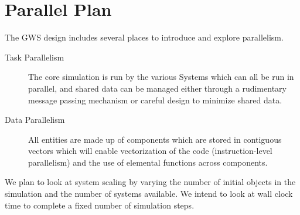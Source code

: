 \chapter*{Parallel Plan}

The GWS design includes several places to introduce and explore parallelism.

\begin{description}
\item[Task Parallelism] The core simulation is run by the various Systems which can all be run in parallel, and shared data can be managed either through a rudimentary message passing mechanism or careful design to minimize shared data.
\item[Data Parallelism] All entities are made up of components which are stored in contiguous vectors which will enable vectorization of the code (instruction-level parallelism) and the use of elemental functions across components.
\end{description}

We plan to look at system scaling by varying the number of initial objects in the simulation and the number of systems available. We intend to look at wall clock time to complete a fixed number of simulation steps.